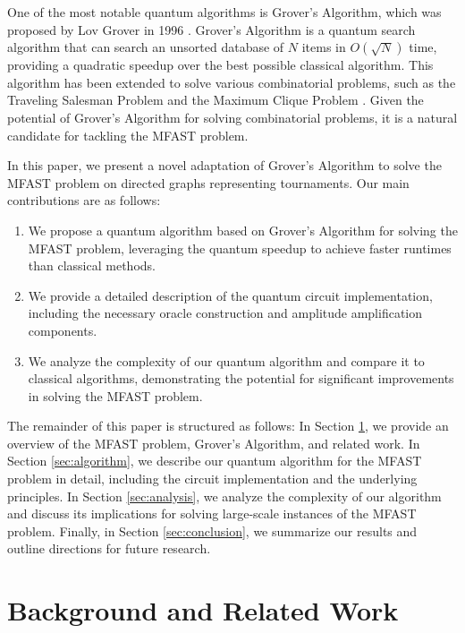 One of the most notable quantum algorithms is Grover's Algorithm, which was proposed by Lov Grover in 1996 \cite{grover1996fast}. Grover's Algorithm is a quantum search algorithm that can search an unsorted database of $N$ items in $O(\sqrt{N})$ time, providing a quadratic speedup over the best possible classical algorithm. This algorithm has been extended to solve various combinatorial problems, such as the Traveling Salesman Problem \cite{zalka1999grover} and the Maximum Clique Problem \cite{childs2000quantum}. Given the potential of Grover's Algorithm for solving combinatorial problems, it is a natural candidate for tackling the MFAST problem.

In this paper, we present a novel adaptation of Grover's Algorithm to solve the MFAST problem on directed graphs representing tournaments. Our main contributions are as follows:

\begin{enumerate}
    \item We propose a quantum algorithm based on Grover's Algorithm for solving the MFAST problem, leveraging the quantum speedup to achieve faster runtimes than classical methods.
    \item We provide a detailed description of the quantum circuit implementation, including the necessary oracle construction and amplitude amplification components.
    \item We analyze the complexity of our quantum algorithm and compare it to classical algorithms, demonstrating the potential for significant improvements in solving the MFAST problem.
\end{enumerate}

The remainder of this paper is structured as follows: In Section \ref{sec:background}, we provide an overview of the MFAST problem, Grover's Algorithm, and related work. In Section \ref{sec:algorithm}, we describe our quantum algorithm for the MFAST problem in detail, including the circuit implementation and the underlying principles. In Section \ref{sec:analysis}, we analyze the complexity of our algorithm and discuss its implications for solving large-scale instances of the MFAST problem. Finally, in Section \ref{sec:conclusion}, we summarize our results and outline directions for future research.

\section{Background and Related Work}
\label{sec:background}

